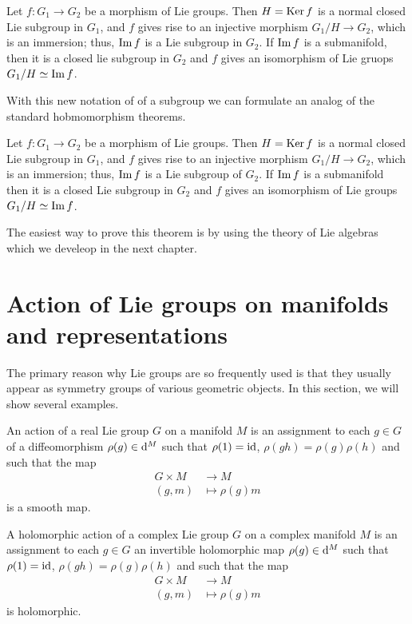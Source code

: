 \begin{theorem}
  Let $f\colon G_1\to G_2$ be a morphism of Lie groups. Then $H=\operatorname{Ker} f$ is
  a normal closed Lie subgroup in $G_1$, and $f$ gives rise to an injective
  morphism $G_1/H\to G_2$, which is an immersion; thus, $\operatorname{Im} f$ is a Lie
  subgroup in $G_2$. If $\operatorname{Im} f$ is a submanifold, then it is a closed lie
  subgroup in $G_2$ and $f$ gives an isomorphism of Lie gruops
  $G_1/H\simeq\operatorname{Im} f$.
\end{theorem}

With this new notation of of a subgroup we can formulate an analog of the
standard hobmomorphism theorems.
\begin{theorem}
  Let $f\colon G_1\to G_2$ be a morphism of Lie groups. Then
  $H=\operatorname{Ker} f$ is a normal closed Lie subgroup in $G_1$, and $f$ gives
  rise to an injective morphism $G_1/H\to G_2$, which is an immersion;
  thus, $\operatorname{Im} f$ is a Lie subgroup of $G_2$. If $\operatorname{Im} f$ is a submanifold
  then it is a closed Lie subgroup in $G_2$ and $f$ gives an isomorphism of
  Lie groups $G_1/H\simeq\operatorname{Im} f$.
\end{theorem}

The easiest way to prove this theorem is by using the theory of Lie
algebras which we develeop in the next chapter.

\section{Action of Lie groups on manifolds and representations}
The primary reason why Lie groups are so frequently used is that they
usually appear as symmetry groups of various geometric objects. In this
section, we will show several examples.

\begin{definition}
  An action of a real Lie group $G$ on a manifold $M$ is an assignment to
  each $g\in G$ of a diffeomorphism $\rho(g)\in\mathop{}\!{\mathrm{d}^M}$ such that
  $\rho(1)=\operatorname{id}$, $\rho(gh)=\rho(g)\rho(h)$ and such that the map
  \[
    \begin{aligned}
      G\times M&\longrightarrow M\\
      (g,m)&\longmapsto \rho(g)m
    \end{aligned}
  \]
  is a smooth map.
\end{definition}

A holomorphic action of a complex Lie group $G$ on a complex manifold $M$
is an assignment to each $g\in G$ an invertible holomorphic map
$\rho(g)\in\mathop{}\!{\mathrm{d}^M}$ such that $\rho(1)=\operatorname{id}$, $\rho(gh)=\rho(g)\rho(h)$ and
such that the map
\[
  \begin{aligned}
    G\times M&\longrightarrow M\\
    (g,m)&\longmapsto \rho(g)m
  \end{aligned}
\]
is holomorphic.

